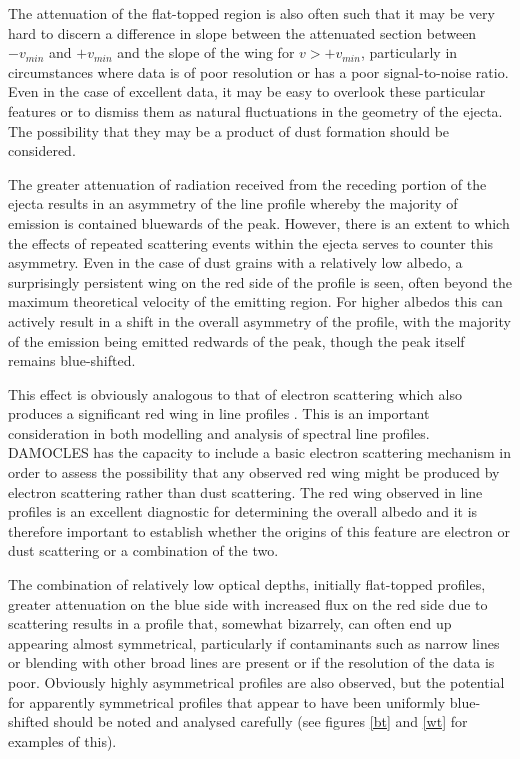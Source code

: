 \documentclass[useAMS,usenatbib,usegraphicx]{mnras}
\begin{document}
The attenuation of the flat-topped region is also often such that it may be very hard to discern a difference in slope between the attenuated section between $-v_{min}$ and $+v_{min}$ and the slope of the wing for $v>+v_{min}$, particularly in circumstances where data is of poor resolution or has a poor signal-to-noise ratio.  Even in the case of excellent data, it may be easy to overlook these particular features or to dismiss them as natural fluctuations in the geometry of the ejecta.  The possibility that they may be a product of dust formation should be considered.

The greater attenuation of radiation received from the receding portion of the ejecta results in an asymmetry of the line profile whereby the majority of emission is contained bluewards of the peak.  However, there is an extent to which the effects of repeated scattering events within the ejecta serves to counter this asymmetry.  Even in the case of dust grains with a relatively low albedo, a surprisingly persistent wing on the red side of the profile is seen, often beyond the maximum theoretical  velocity of the emitting region.  For higher albedos this can actively result in a shift in the overall asymmetry of the profile, with the majority of the emission being emitted redwards of the peak, though the peak itself remains blue-shifted.  

This effect is obviously analogous to that of electron scattering which also produces a significant red wing in line profiles \citep{Hillier1991, Auer1972b}. This is an important consideration in both modelling and analysis of spectral line profiles.  DAMOCLES has the capacity to include a basic electron scattering mechanism in order to assess the possibility that any observed red wing might be produced by electron scattering rather than dust scattering.  The red wing observed in line profiles is an excellent diagnostic for determining the overall albedo and it is therefore important to establish whether the origins of this feature are electron or dust scattering or a combination of the two.

The combination of relatively low optical depths, initially flat-topped profiles, greater attenuation on the blue side with increased flux on the red side due to scattering results in a profile that, somewhat bizarrely, can often end up appearing almost symmetrical, particularly if contaminants such as narrow lines or blending with other broad lines are present or if the resolution of the data is poor.   Obviously highly asymmetrical profiles are also observed, but the potential for apparently symmetrical profiles that appear to have been uniformly blue-shifted should be noted and analysed carefully (see figures \ref{bt} and \ref{wt} for examples of this).
\end{document}
